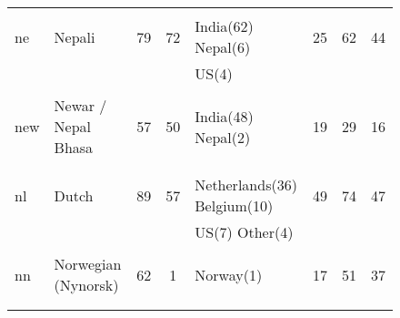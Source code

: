 \begin{figure}[h]
\begin{tabular}{llcclccc}
&&&&&&&\\
ne&Nepali&79&72&India(62) Nepal(6) &25&62&44\\
&&&&US(4) &&&\\
&&&&&&&\\
new&Newar / Nepal Bhasa&57&50&India(48) Nepal(2) &19&29&16\\
&&&&&&&\\
&&&&&&&\\
nl&Dutch&89&57&Netherlands(36) Belgium(10) &49&74&47\\
&&&&US(7) Other(4) &&&\\
&&&&&&&\\
nn&Norwegian (Nynorsk)&62&1&Norway(1) &17&51&37\\
&&&&&&&\\
&&&&&&&\\
\end{tabular}
\end{figure}
\clearpage
